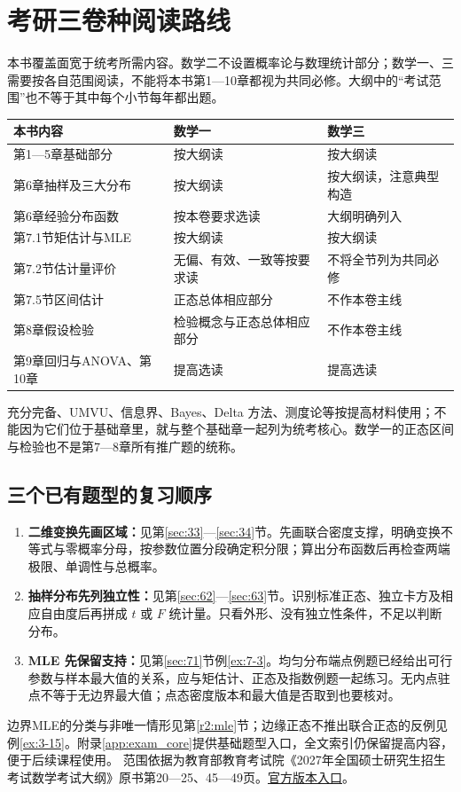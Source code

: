 \chapter*{考研三卷种阅读路线}
本书覆盖面宽于统考所需内容。数学二不设置概率论与数理统计部分；数学一、三需要按各自范围阅读，不能将本书第1—10章都视为共同必修。大纲中的“考试范围”也不等于其中每个小节每年都出题。

\begin{center}
\begin{tabularx}{\textwidth}{@{}p{}XX@{}}
\toprule 本书内容&数学一&数学三\\\midrule
第1—5章基础部分&按大纲读&按大纲读\\
第6章抽样及三大分布&按大纲读&按大纲读，注意典型构造\\
第6章经验分布函数&按本卷要求选读&大纲明确列入\\
第7.1节矩估计与MLE&按大纲读&按大纲读\\
第7.2节估计量评价&无偏、有效、一致等按要求读&不将全节列为共同必修\\
第7.5节区间估计&正态总体相应部分&不作本卷主线\\
第8章假设检验&检验概念与正态总体相应部分&不作本卷主线\\
第9章回归与ANOVA、第10章&提高选读&提高选读\\
\bottomrule
\end{tabularx}
\end{center}

充分完备、UMVU、信息界、Bayes、Delta 方法、测度论等按提高材料使用；不能因为它们位于基础章里，就与整个基础章一起列为统考核心。数学一的正态区间与检验也不是第7—8章所有推广题的统称。

\section*{三个已有题型的复习顺序}
\begin{enumerate}
\item \textbf{二维变换先画区域：}见第\ref{sec:33}—\ref{sec:34}节。先画联合密度支撑，明确变换不等式与零概率分母，按参数位置分段确定积分限；算出分布函数后再检查两端极限、单调性与总概率。
\item \textbf{抽样分布先列独立性：}见第\ref{sec:62}—\ref{sec:63}节。识别标准正态、独立卡方及相应自由度后再拼成 $t$ 或 $F$ 统计量。只看外形、没有独立性条件，不足以判断分布。
\item \textbf{MLE 先保留支持：}见第\ref{sec:71}节例\ref{ex:7-3}。均匀分布端点例题已经给出可行参数与样本最大值的关系，应与矩估计、正态及指数例题一起练习。无内点驻点不等于无边界最大值；点态密度版本和最大值是否取到也要核对。
\end{enumerate}

边界MLE的分类与非唯一情形见第\ref{r2:mle}节；边缘正态不推出联合正态的反例见例\ref{ex:3-15}。附录\ref{app:exam_core}提供基础题型入口，全文索引仍保留提高内容，便于后续课程使用。
范围依据为教育部教育考试院《2027年全国硕士研究生招生考试数学考试大纲》原书第20—25、45—49页。\href{https://xuanshu.hep.com.cn/front/book/findBookDetails?bookId=6aa1910be119ac97297a608f}{官方版本入口}。
